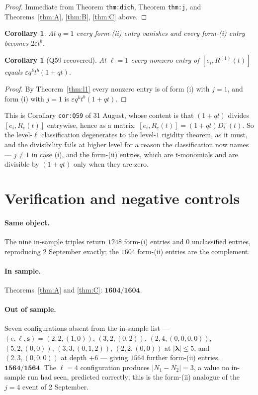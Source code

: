 \documentclass[11pt]{article}
\newtheorem{corollary}[theorem]{Corollary}
\theoremstyle{definition}
\theoremstyle{remark}
\newcommand{\bl}{\boldsymbol{\lambda}}
\newcommand{\bs}{\mathbf{s}}
\begin{document}
\begin{proof}
Immediate from Theorem \texttt{thm:dich}, Theorem \texttt{thm:j}, and
Theorems~\ref{thm:A}, \ref{thm:B}, \ref{thm:C} above.
\end{proof}

\begin{corollary}\label{cor:q1}
At $q=1$ every form-(ii) entry vanishes and every form-(i) entry becomes
$2\varepsilon t^{b}$.
\end{corollary}

\begin{corollary}[Q59 recovered]\label{cor:q59}
At $\ell=1$ every nonzero entry of $[e_i,R^{(1)}(t)]$ equals $\varepsilon q^{k}t^{b}(1+qt)$.
\end{corollary}
\begin{proof}
By Theorem~\ref{thm:l1} every nonzero entry is of form (i) with $j=1$, and form (i) with
$j=1$ is $\varepsilon q^{k}t^{b}(1+qt)$.
\end{proof}

This is Corollary \texttt{cor:Q59} of 31 August, whose content is that $(1+qt)$ divides
$[e_i,R_e(t)]$ entrywise, hence as a matrix: $[e_i,R_e(t)]=(1+qt)D^{-}_i(t)$. So the
level-$\ell$ classification degenerates to the level-$1$ rigidity theorem, as it must,
and the divisibility fails at higher level for a reason the classification now names ---
$j\ne1$ in case (i), and the form-(ii) entries, which are $t$-monomials and are divisible
by $(1+qt)$ only when they are zero.

\section{Verification and negative controls}\label{sec:controls}

\paragraph{Same object.} The nine in-sample triples return $1248$ form-(i) entries and
$0$ unclassified entries, reproducing 2 September exactly; the $1604$ form-(ii) entries
are the complement.

\paragraph{In sample.} Theorems~\ref{thm:A} and \ref{thm:C}: $\mathbf{1604/1604}$.

\paragraph{Out of sample.} Seven configurations absent from the in-sample list ---
$(e,\ell,\bs)=(2,2,(1,0))$, $(3,2,(0,2))$, $(2,4,(0,0,0,0))$, $(5,2,(0,0))$,
$(3,3,(0,1,2))$, $(2,2,(0,0))$ at $|\bl|\le5$, and $(2,3,(0,0,0))$ at depth $+6$ ---
giving $1564$ further form-(ii) entries. $\mathbf{1564/1564}$. The $\ell=4$ configuration
produces $|N_1-N_2|=3$, a value no in-sample run had seen, predicted correctly; this is
the form-(ii) analogue of the $j=4$ event of 2 September.
\end{document}
